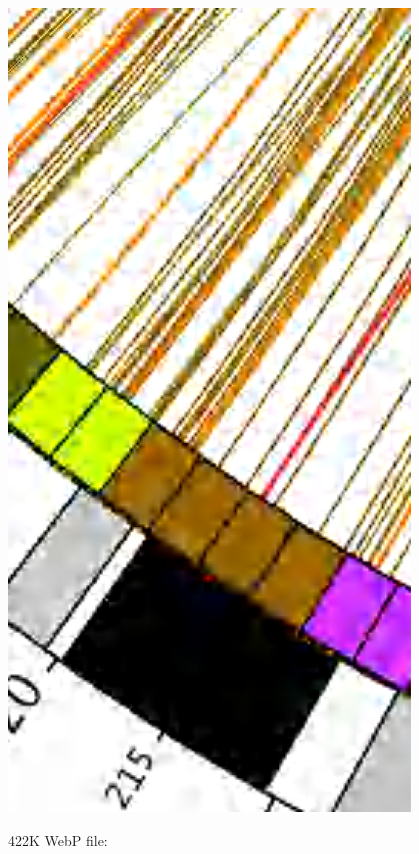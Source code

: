 \documentclass[a4paper,USenglish]{lipics}
\begin{document}
\begin{figure}
\begin{minipage}[b]{0.25\textwidth}
\includegraphics[width=0.95\textwidth]{images/c_jp2}
\end{minipage}%
\begin{minipage}[b]{0.25\textwidth}
422K WebP file:\\

\end{minipage}
\end{figure}
\end{document}
